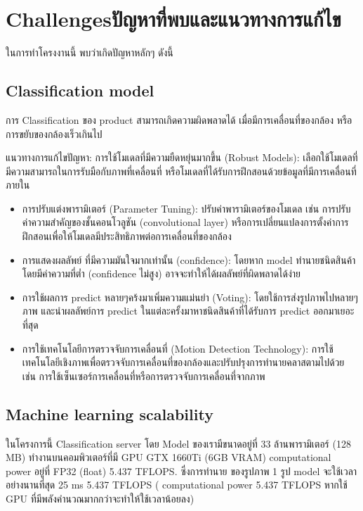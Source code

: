 \section{\ifenglish Challenges\else ปัญหาที่พบและแนวทางการแก้ไข\fi}
ในการทำโครงงานนี้ พบว่าเกิดปัญหาหลักๆ ดังนี้

\subsection{Classification model}
\par การ Classification ของ product สามารถเกิดความผิดพลาดได้ เมื่อมีการเคลื่อนที่ของกล้อง หรือการขยับของกล้องเร็วเกินไป

แนวทางการแก้ไขปัญหา:
การใช้โมเดลที่มีความยืดหยุ่นมากขึ้น (Robust Models): เลือกใช้โมเดลที่มีความสามารถในการรับมือกับภาพที่เคลื่อนที่ หรือโมเดลที่ได้รับการฝึกสอนด้วยข้อมูลที่มีการเคลื่อนที่ภายใน
\begin{itemize}
    \item การปรับแต่งพารามิเตอร์ (Parameter Tuning): ปรับค่าพารามิเตอร์ของโมเดล เช่น การปรับค่าความสำคัญของชั้นคอนโวลูชัน (convolutional layer) หรือการเปลี่ยนแปลงการตั้งค่าการฝึกสอนเพื่อให้โมเดลมีประสิทธิภาพต่อการเคลื่อนที่ของกล้อง
    \item การแสดงผลลัพย์ ที่มีความมันใจมากเท่านั้น  (confidence): โดยหาก model ทำนายชนิดสินค้าโดยมีค่าความที่ต่ำ (confidence ไม่สูง) อาจจะทำให้ได้ผลลัพย์ที่ผิดพลาดได้ง่าย
    \item การใช้ผลการ predict หลายๆคร้งมาเพิ่มความแม่นยำ (Voting): โดยใช้การส่งรูปภาพไปหลายๆภาพ และนำผลลัพย์การ predict ในแต่ละครั้งมาหาชนิดสินค้าที่ได้รับการ predict ออกมาเยอะที่สุด
    \item การใช้เทคโนโลยีการตรวจจับการเคลื่อนที่ (Motion Detection Technology): การใช้เทคโนโลยีเชิงภาพเพื่อตรวจจับการเคลื่อนที่ของกล้องและปรับปรุงการทำนายคลาสตามไปด้วย เช่น การใช้เซ็นเซอร์การเคลื่อนที่หรือการตรวจจับการเคลื่อนที่จากภาพ
\end{itemize}

\subsection{Machine learning scalability}
\par ในโครงการนี้ Classification server โดย Model ของเรามีขนาดอยู่ที่ 33 ล้านพารามิเตอร์ (128 MB)
ทำงานบนคอมพิวเตอร์ที่มี GPU GTX 1660Ti (6GB VRAM)  computational power อยู่ที่ FP32 (float) 5.437 TFLOPS.
ซึ่งการทำนาย ของรูปภาพ 1 รูป model จะใช้เวลาอย่างนานที่สุด 25 ms
5.437 TFLOPS ( computational power 5.437 TFLOPS หากใช้ GPU ที่มีพลังคำนวณมากกว่าจะทำให้ใช้เวลาน้อยลง)

